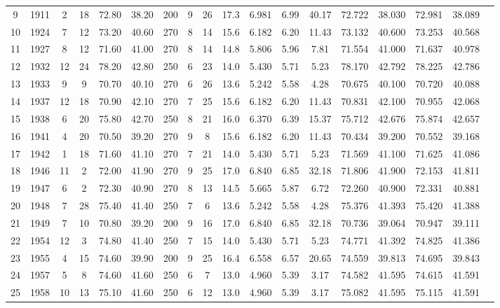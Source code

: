 \begin{longtable}{cccccccccccccccccc}
  9 & 1911 & 2 & 18 & 72.80 & 38.20 & 200 & 9 & 26 & 17.3 & 6.981 & 6.99 & 40.17 & 72.722 & 38.030 & 72.981 & 38.089 \\ 
  10 & 1924 & 7 & 12 & 73.20 & 40.60 & 270 & 8 & 14 & 15.6 & 6.182 & 6.20 & 11.43 & 73.132 & 40.600 & 73.253 & 40.568 \\ 
  11 & 1927 & 8 & 12 & 71.60 & 41.00 & 270 & 8 & 14 & 14.8 & 5.806 & 5.96 & 7.81 & 71.554 & 41.000 & 71.637 & 40.978 \\ 
  12 & 1932 & 12 & 24 & 78.20 & 42.80 & 250 & 6 & 23 & 14.0 & 5.430 & 5.71 & 5.23 & 78.170 & 42.792 & 78.225 & 42.786 \\ 
  13 & 1933 & 9 & 9 & 70.70 & 40.10 & 270 & 6 & 26 & 13.6 & 5.242 & 5.58 & 4.28 & 70.675 & 40.100 & 70.720 & 40.088 \\ 
  14 & 1937 & 12 & 18 & 70.90 & 42.10 & 270 & 7 & 25 & 15.6 & 6.182 & 6.20 & 11.43 & 70.831 & 42.100 & 70.955 & 42.068 \\ 
  15 & 1938 & 6 & 20 & 75.80 & 42.70 & 250 & 8 & 21 & 16.0 & 6.370 & 6.39 & 15.37 & 75.712 & 42.676 & 75.874 & 42.657 \\ 
  16 & 1941 & 4 & 20 & 70.50 & 39.20 & 270 & 9 & 8 & 15.6 & 6.182 & 6.20 & 11.43 & 70.434 & 39.200 & 70.552 & 39.168 \\ 
  17 & 1942 & 1 & 18 & 71.60 & 41.10 & 270 & 7 & 21 & 14.0 & 5.430 & 5.71 & 5.23 & 71.569 & 41.100 & 71.625 & 41.086 \\ 
  18 & 1946 & 11 & 2 & 72.00 & 41.90 & 270 & 9 & 25 & 17.0 & 6.840 & 6.85 & 32.18 & 71.806 & 41.900 & 72.153 & 41.811 \\ 
  19 & 1947 & 6 & 2 & 72.30 & 40.90 & 270 & 8 & 13 & 14.5 & 5.665 & 5.87 & 6.72 & 72.260 & 40.900 & 72.331 & 40.881 \\ 
  20 & 1948 & 7 & 28 & 75.40 & 41.40 & 250 & 7 & 6 & 13.6 & 5.242 & 5.58 & 4.28 & 75.376 & 41.393 & 75.420 & 41.388 \\ 
  21 & 1949 & 7 & 10 & 70.80 & 39.20 & 200 & 9 & 16 & 17.0 & 6.840 & 6.85 & 32.18 & 70.736 & 39.064 & 70.947 & 39.111 \\ 
  22 & 1954 & 12 & 3 & 74.80 & 41.40 & 250 & 7 & 15 & 14.0 & 5.430 & 5.71 & 5.23 & 74.771 & 41.392 & 74.825 & 41.386 \\ 
  23 & 1955 & 4 & 15 & 74.60 & 39.90 & 200 & 9 & 25 & 16.4 & 6.558 & 6.57 & 20.65 & 74.559 & 39.813 & 74.695 & 39.843 \\ 
  24 & 1957 & 5 & 8 & 74.60 & 41.60 & 250 & 6 & 7 & 13.0 & 4.960 & 5.39 & 3.17 & 74.582 & 41.595 & 74.615 & 41.591 \\ 
  25 & 1958 & 10 & 13 & 75.10 & 41.60 & 250 & 6 & 12 & 13.0 & 4.960 & 5.39 & 3.17 & 75.082 & 41.595 & 75.115 & 41.591 \\ 

\end{longtable}
